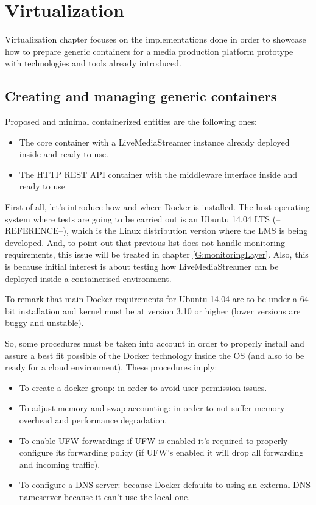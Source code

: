 \chapter{Virtualization}\label{D:virtualization}

Virtualization chapter focuses on the implementations done in order to showcase how to prepare generic containers for a media production platform prototype with technologies and tools already introduced. 

\section{Creating and managing generic containers}
Proposed and minimal containerized entities are the following ones:

\begin{itemize}
\item The core container with a LiveMediaStreamer instance already deployed inside and ready to use.
\item The HTTP REST API container with the middleware interface inside and ready to use
\end{itemize}

First of all, let's introduce how and where Docker is installed. The host operating system where tests are going to be carried out is an Ubuntu 14.04 LTS (--REFERENCE--), which is the Linux distribution version where the LMS is being developed. And, to point out that previous list does not handle monitoring requirements, this issue will be treated in chapter \ref{G:monitoringLayer}. Also, this is because initial interest is about testing how LiveMediaStreamer can be deployed inside a containerised environment.

To remark that main Docker requirements for Ubuntu 14.04 are to be under a 64-bit installation and kernel must be at version 3.10 or higher (lower versions are buggy and unstable). 

So, some procedures must be taken into account in order to properly install and assure a best fit possible of the Docker technology inside the OS (and also to be ready for a cloud environment). These procedures imply:

\begin{itemize}
\item To create a docker group: in order to avoid user permission issues.
\item To adjust memory and swap accounting: in order to not suffer memory overhead and performance degradation.
\item To enable UFW forwarding: if UFW is enabled it's required to properly configure its forwarding policy (if UFW's enabled it will drop all forwarding and incoming traffic).
\item To configure a DNS server: because Docker defaults to using an external DNS nameserver because it can't use the local one.
\end{itemize}

